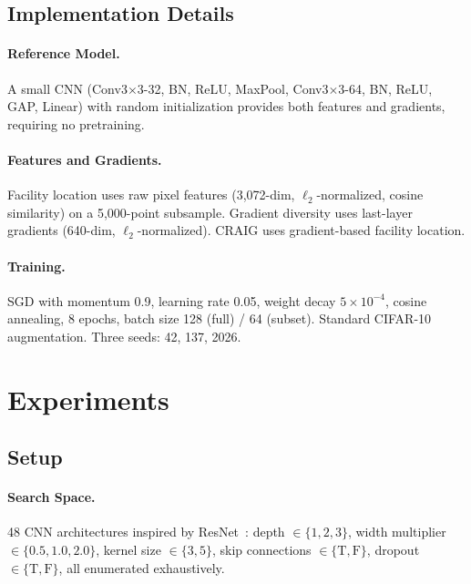 \documentclass{cvpr}
\begin{document}
\subsection{Implementation Details}
\label{sec:impl_details}

\paragraph{Reference Model.} A small CNN (Conv3$\times$3-32, BN, ReLU, MaxPool, Conv3$\times$3-64, BN, ReLU, GAP, Linear) with random initialization provides both features and gradients, requiring no pretraining.

\paragraph{Features and Gradients.} Facility location uses raw pixel features (3,072-dim, $\ell_2$-normalized, cosine similarity) on a 5,000-point subsample. Gradient diversity uses last-layer gradients (640-dim, $\ell_2$-normalized). CRAIG uses gradient-based facility location.

\paragraph{Training.} SGD with momentum 0.9, learning rate 0.05, weight decay $5{\times}10^{-4}$, cosine annealing, 8 epochs, batch size 128 (full) / 64 (subset). Standard CIFAR-10 augmentation. Three seeds: 42, 137, 2026.

\section{Experiments}
\label{sec:experiments}

\subsection{Setup}

\paragraph{Search Space.}
48 CNN architectures inspired by ResNet~\cite{he2016resnet}: depth $\in \{1,2,3\}$, width multiplier $\in \{0.5, 1.0, 2.0\}$, kernel size $\in \{3,5\}$, skip connections $\in \{\text{T},\text{F}\}$, dropout $\in \{\text{T},\text{F}\}$, all enumerated exhaustively.
\end{document}
